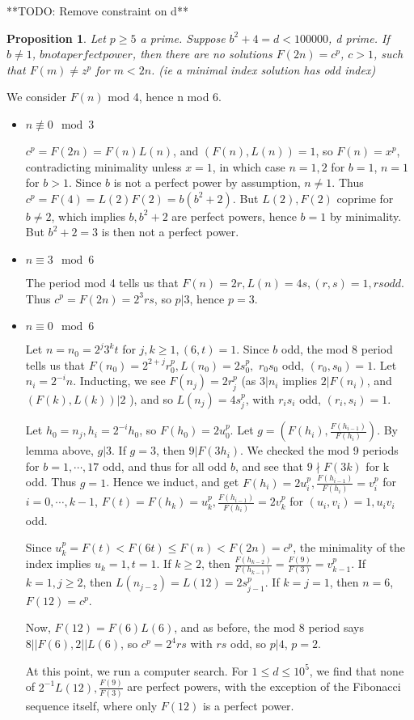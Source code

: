 \documentclass[12pt]{article}
\newtheorem{prop}[thm]{Proposition}
\newenvironment{proof}[1][Proof.]{\begin{trivlist}
\item[\hskip \labelsep {\bfseries #1}]}{\end{trivlist}}
\begin{document}
**TODO: Remove constraint on d**
\begin{prop}
Let $p \geq 5$ a prime. Suppose $b^2 + 4 = d < 100000$, d prime. If $b \neq 1$, $b not a perfect power$, then there are no solutions $F(2n) = c^p$, $c > 1$, such that $F(m) \neq z^p$ for $m < 2n$. (ie a minimal index solution has odd index)
\end{prop}
\begin{proof}
We consider $F(n)$ mod 4, hence n mod 6.
\begin{itemize}
\item{$n \not\equiv 0 \mod 3$}

$c^p = F(2n) = F(n)L(n)$, and $(F(n), L(n)) = 1$, so $F(n) = x^p$, contradicting minimality unless $x=1$, in which case $n=1,2$ for $b=1$, $n=1$ for $b>1$. Since $b$ is not a perfect power by assumption, $n \neq 1$. Thus $c^p = F(4) = L(2)F(2) = b(b^2 + 2)$. But $L(2), F(2)$ coprime for $b \neq 2$, which implies $b, b^2+2$ are perfect powers, hence $b=1$ by minimality. But $b^2+2=3$ is then not a perfect power.
 
\item{$n \equiv 3 \mod 6$}

The period mod 4 tells us that $F(n) = 2r, L(n) = 4s, (r,s)=1, rs odd$. Thus $c^p = F(2n) = 2^3rs$, so $p|3$, hence $p=3$. 

\item{$n \equiv 0 \mod 6$}

Let $n = n_0 = 2^j3^kt$ for $j,k \geq 1, (6, t) = 1$. Since $b$ odd, the mod 8 period tells us that $F(n_0) = 2^{2+j}r_0^p, L(n_0)=2s_0^p,$ $r_0s_0$ odd, $(r_0,s_0)=1$. Let $n_i = 2^{-i}n$. Inducting, we see $F(n_j) = 2r_j^p$ (as $3|n_i$ implies $2|F(n_i)$, and $(F(k), L(k)) | 2$ ), and so $L(n_j) = 4s_j^p$, with $r_is_i$ odd, $(r_i, s_i) = 1$.

Let $h_0 = n_j, h_i = 2^{-i}h_0$, so $F(h_0) = 2u_0^p$. Let $g = (F(h_i), \frac{F(h_{i-1})}{F(h_i)})$. By lemma above, $g|3$. If $g = 3$, then $9 | F(3h_i)$. We checked the mod 9 periods for $b=1,\cdots,17$ odd, and thus for all odd $b$, and see that $9 \nmid F(3k)$ for k odd. Thus $g=1$. Hence we induct, and get $F(h_i) = 2u_i^p, \frac{F(h_{i-1})}{F(h_i)} = v_i^p$ for $i=0,\cdots,k-1$, $F(t) = F(h_k) = u_k^p, \frac{F(h_{i-1})}{F(h_i)} = 2v_k^p$ for $(u_i, v_i) = 1, u_i v_i$ odd.

Since $u_k^p = F(t) < F(6t) \leq F(n) < F(2n) = c^p$, the minimality of the index implies $u_k = 1, t = 1$. If $k \geq 2$, then $\frac{F(h_{k-2})}{F(h_{k-1})} = \frac{F(9)}{F(3)} = v_{k-1}^p$. If $k = 1, j \geq 2$, then $L(n_{j-2}) = L(12) = 2 s_{j-1}^p$. If $k = j = 1$, then $n = 6$, $F(12) = c^p$. 

Now, $F(12) = F(6)L(6)$, and as before, the mod 8 period says $8 || F(6), 2 || L(6)$, so $c^p = 2^4rs$ with $rs$ odd, so $p|4$, $p=2$.

At this point, we run a computer search. For $1 \leq d \le 10^5$, we find that none of $2^{-1}L(12), \frac{F(9)}{F(3)}$ are perfect powers, with the exception of the Fibonacci sequence itself, where only $F(12)$ is a perfect power.
\end{itemize}
\end{proof}
\end{document}
